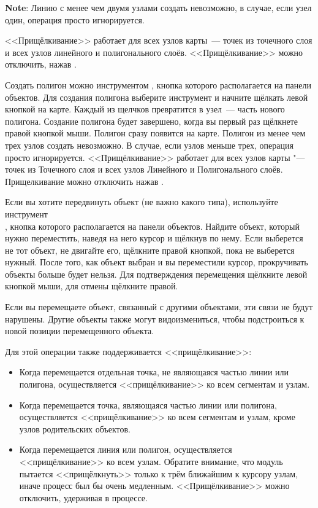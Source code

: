 \textbf{Note}: Линию с менее чем двумя узлами создать невозможно, в
случае, если узел один, операция просто игнорируется.

<<Прищёлкивание>> работает для всех узлов карты~--- точек из точечного слоя
и всех узлов линейного и полигонального слоёв. <<Прищёлкивание>> можно
отключить, нажав .


Создать полигон можно инструментом ,
кнопка которого располагается на панели объектов. Для создания
полигона выберите инструмент и начните щёлкать левой кнопкой на карте. Каждый
из щелчков превратится в узел~--- часть нового полигона. Создание полигона
будет завершено, когда вы первый раз щёлкнете правой кнопкой мыши.
Полигон сразу появится на карте. Полигон из менее чем трех узлов создать
невозможно. В случае, если узлов меньше трех, операция просто
игнорируется. <<Прищёлкивание>> работает для всех узлов карты "--- точек из
Точечного слоя и всех узлов Линейного и Полигонального слоёв.
Прищелкивание можно отключить нажав .


Если вы хотите передвинуть объект (не важно какого типа), используйте
инструмент \\
, кнопка которого
располагается на панели объектов. Найдите объект, который нужно
переместить, наведя на него курсор и щёлкнув по нему. Если выберется не
тот объект, не двигайте его, щёлкните правой кнопкой, пока не выберется
нужный. После того, как объект выбран и вы переместили курсор,
прокручивать объекты больше будет нельзя. Для подтверждения
перемещения щёлкните левой кнопкой мыши, для отмены щёлкните правой.

Если вы перемещаете объект, связанный с другими объектами, эти связи не
будут нарушены. Другие объекты также могут видоизмениться, чтобы
подстроиться к новой позиции перемещенного объекта.

Для этой операции также поддерживается <<прищёлкивание>>:

\begin{itemize}[label=--]
\item Когда перемещается отдельная точка, не являющаяся частью линии или
полигона, осуществляется <<прищёлкивание>> ко всем сегментам и узлам.
\item Когда перемещается точка, являющаяся частью линии или полигона,
осуществляется <<прищёлкивание>> ко всем сегментам и узлам, кроме узлов
родительских объектов.
\item Когда перемещается линия или полигон, осуществляется <<прищёлкивание>>
ко всем узлам. Обратите внимание, что модуль пытается <<прищёлкнуть>> только
к трём ближайшим к курсору узлам, иначе процесс был бы очень медленным.
<<Прищёлкивание>> можно отключить, удерживая  в процессе.
\end{itemize}

